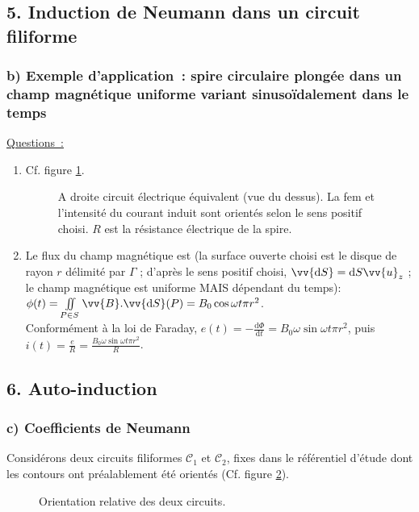 \documentclass{article}
\let\oldiint\iint
\renewcommand{\iint}{\oldiint\limits}
\renewcommand\overrightarrow{\vv}
\begin{document}
\subsection*{5. Induction de Neumann dans un circuit filiforme}
\subsubsection*{b) Exemple d'application : spire circulaire plongée dans un
champ magnétique uniforme variant sinusoïdalement dans le temps}
\underline{Questions :}
\begin{enumerate}
\item Cf. figure \ref{Fig.2}.

\begin{figure}[h]
\begin{center}
\end{center}
\caption{A droite circuit électrique équivalent (vue du dessus). La
fem et l'intensité du courant induit sont orientés selon le sens
positif choisi. $R$ est la résistance électrique de la
spire.}\label{Fig.2}
\end{figure}


\item Le flux du champ magnétique est (la surface ouverte choisi est le disque de rayon $r$ délimité par $\Gamma$ ; d'après le sens positif
choisi, $\overrightarrow{\mathrm{d}S}=\mathrm{d}S\overrightarrow{u}_{z}$ ; le champ
magnétique est uniforme MAIS dépendant du temps): $\phi(t) =
\iint_{P\in S} \overrightarrow{B}.\overrightarrow{\mathrm{d}S}(P) = B_{0}\cos
\omega t \pi r^{2}$. \\
Conformément à la loi de Faraday, $e(t) = -\frac{\mathrm{d}\Phi}{\mathrm{d}t} =
B_{0}\omega \sin\omega t \pi r^{2}$, puis $i(t) = \frac{e}{R} =
\frac{B_{0}\omega \sin\omega t \pi r^{2}}{R}$.
\end{enumerate}

\subsection*{6. Auto-induction}
\subsubsection*{c) Coefficients de Neumann}
Considérons deux circuits filiformes $\mathcal{C}_{1}$ et
$\mathcal{C}_{2}$, fixes dans le référentiel d'étude dont les
contours ont préalablement été orientés (Cf. figure \ref{Fig.3}).
\begin{figure}[h]
\begin{center}
\end{center}
\caption{Orientation relative des deux circuits.}\label{Fig.3}
\end{figure}
\end{document}

